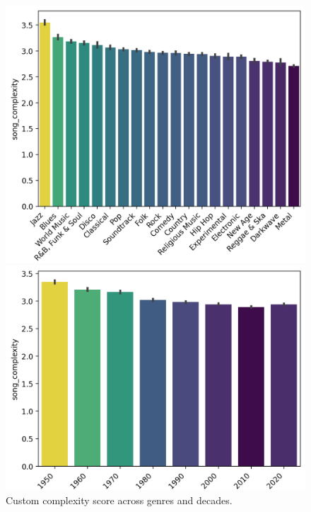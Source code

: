 \documentclass{article}
\begin{document}
\begin{figure}[!htbp]
    \centering
    \begin{minipage}{.49\textwidth}
        \centering
        \includegraphics[width=\linewidth]{images/complexity-across-genres.png}
    \end{minipage}\hfill
    \begin{minipage}{.49\textwidth}
        \centering
        \includegraphics[width=\linewidth]{images/complexity-across-decades.png}
        \vspace{0.475cm}
    \end{minipage}
    \caption{Custom complexity score across genres and decades.}
    \label{fig:complexity-genres-decades}
\end{figure}
\end{document}
